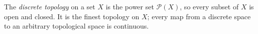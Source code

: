 
The \emph{discrete topology} on a set $X$ is the power set $\mathcal P(X)$, so every subset of $X$ is open and closed. It is the finest topology on $X$; every map from a discrete space to an arbitrary topological space is continuous.
